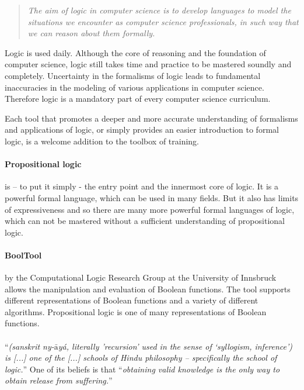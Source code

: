 
\begin{quote}
\em The aim of logic in computer science is to develop languages 
to model the situations we encounter as computer science professionals, 
in such way that we can reason about them formally. \cite{Huth:2004:LCS:975331}
\end{quote}

Logic is used daily. Although the core of reasoning and the foundation of computer science, 
logic still takes time and practice to be mastered soundly and completely. 
Uncertainty in the formalisms of logic leads to fundamental inaccuracies 
in the modeling of various applications in computer science. 
Therefore logic is a mandatory part of every computer science curriculum. 

Each tool that promotes a deeper and more accurate understanding of formalisms and applications of logic,
or simply provides an easier introduction to formal logic, 
is a welcome addition to the toolbox of training.


\paragraph{Propositional logic} is – to put it simply - the entry point and the innermost core of logic. 
It is a powerful formal language, which can be used in many fields. 
But it also has limits of expressiveness and so 
there are many more powerful formal languages of logic, 
which can not be mastered without a sufficient understanding  of propositional logic.

\paragraph{BoolTool} by the Computational Logic Research Group at the University of Innsbruck allows the manipulation and evaluation of Boolean functions. The tool supports different representations of Boolean functions and a variety of different algorithms.
Propositional logic is one of many representations of Boolean functions.

\paragraph{\Nyaya} “{\em (sanskrit ny-$\bar{\mbox{a}}$yá, literally 'recursion’  used in the sense of  ‘syllogism, inference’) is [...] one of the [...] schools of Hindu philosophy – specifically the school of logic.}” \cite{WIKIPEDIA:NYAYA}
One of its beliefs is that 
“{\em obtaining valid knowledge is the only way  to obtain release from suffering.}” \cite{IEP:NYAYA} 

